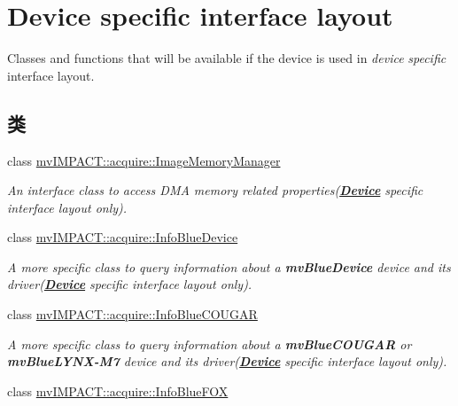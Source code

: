 \hypertarget{group___device_specific_interface}{\section{Device specific interface layout}
\label{group___device_specific_interface}
}


Classes and functions that will be available if the device is used in {\itshape device} {\itshape specific} interface layout.  


\subsection*{类}
\begin{DoxyCompactItemize}
\item 
class \hyperlink{classmv_i_m_p_a_c_t_1_1acquire_1_1_image_memory_manager}{mv\+I\+M\+P\+A\+C\+T\+::acquire\+::\+Image\+Memory\+Manager}
\begin{DoxyCompactList}\small\item\em An interface class to access D\+M\+A memory related properties({\bfseries \hyperlink{classmv_i_m_p_a_c_t_1_1acquire_1_1_device}{Device}} specific interface layout only). \end{DoxyCompactList}\item 
class \hyperlink{classmv_i_m_p_a_c_t_1_1acquire_1_1_info_blue_device}{mv\+I\+M\+P\+A\+C\+T\+::acquire\+::\+Info\+Blue\+Device}
\begin{DoxyCompactList}\small\item\em A more specific class to query information about a {\bfseries mv\+Blue\+Device} device and its driver({\bfseries \hyperlink{classmv_i_m_p_a_c_t_1_1acquire_1_1_device}{Device}} specific interface layout only). \end{DoxyCompactList}\item 
class \hyperlink{classmv_i_m_p_a_c_t_1_1acquire_1_1_info_blue_c_o_u_g_a_r}{mv\+I\+M\+P\+A\+C\+T\+::acquire\+::\+Info\+Blue\+C\+O\+U\+G\+A\+R}
\begin{DoxyCompactList}\small\item\em A more specific class to query information about a {\bfseries mv\+Blue\+C\+O\+U\+G\+A\+R} or {\bfseries mv\+Blue\+L\+Y\+N\+X-\/\+M7} device and its driver({\bfseries \hyperlink{classmv_i_m_p_a_c_t_1_1acquire_1_1_device}{Device}} specific interface layout only). \end{DoxyCompactList}\item 
class \hyperlink{classmv_i_m_p_a_c_t_1_1acquire_1_1_info_blue_f_o_x}{mv\+I\+M\+P\+A\+C\+T\+::acquire\+::\+Info\+Blue\+F\+O\+X}

\end{DoxyCompactItemize}
